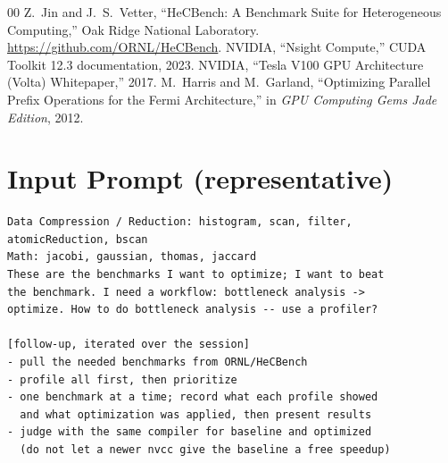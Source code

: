 \documentclass[conference]{IEEEtran}
\newcommand{\mainbodyendpage}{?}
\begin{document}
\begin{thebibliography}{00}
 Z.\ Jin and J.\ S.\ Vetter, ``HeCBench: A Benchmark Suite for
Heterogeneous Computing,'' Oak Ridge National Laboratory.
\url{https://github.com/ORNL/HeCBench}.
 NVIDIA, ``Nsight Compute,'' CUDA Toolkit 12.3 documentation, 2023.
 NVIDIA, ``Tesla V100 GPU Architecture (Volta) Whitepaper,'' 2017.
 M.\ Harris and M.\ Garland, ``Optimizing Parallel Prefix
Operations for the Fermi Architecture,'' in \emph{GPU Computing Gems Jade
Edition}, 2012.
\end{thebibliography}

\xdef\mainbodyendpage{\thepage}

\appendices

\section{Input Prompt (representative)}
\begin{lstlisting}
Data Compression / Reduction: histogram, scan, filter,
atomicReduction, bscan
Math: jacobi, gaussian, thomas, jaccard
These are the benchmarks I want to optimize; I want to beat
the benchmark. I need a workflow: bottleneck analysis ->
optimize. How to do bottleneck analysis -- use a profiler?

[follow-up, iterated over the session]
- pull the needed benchmarks from ORNL/HeCBench
- profile all first, then prioritize
- one benchmark at a time; record what each profile showed
  and what optimization was applied, then present results
- judge with the same compiler for baseline and optimized
  (do not let a newer nvcc give the baseline a free speedup)
\end{lstlisting}
\end{document}
